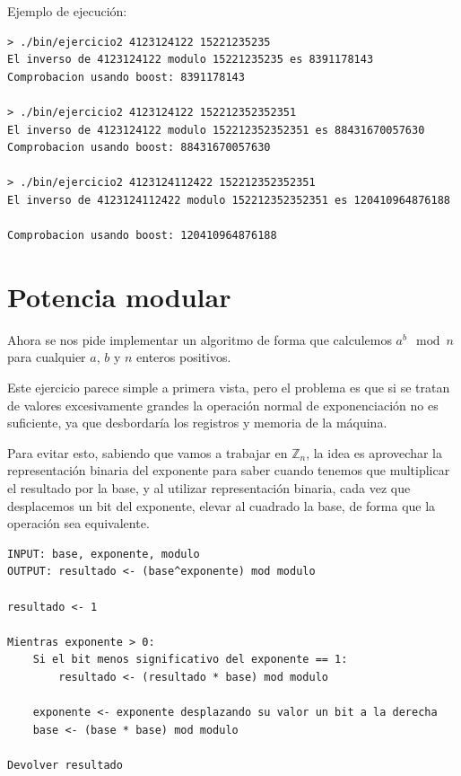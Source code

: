 \documentclass[12pt, spanish]{article}
\begin{document}
Ejemplo de ejecución:

\begin{lstlisting}
> ./bin/ejercicio2 4123124122 15221235235
El inverso de 4123124122 modulo 15221235235 es 8391178143
Comprobacion usando boost: 8391178143

> ./bin/ejercicio2 4123124122 152212352352351
El inverso de 4123124122 modulo 152212352352351 es 88431670057630
Comprobacion usando boost: 88431670057630

> ./bin/ejercicio2 4123124112422 152212352352351
El inverso de 4123124112422 modulo 152212352352351 es 120410964876188

Comprobacion usando boost: 120410964876188
\end{lstlisting}

\section{Potencia modular}

Ahora se nos pide implementar un algoritmo de forma que calculemos $a^b \mod n$ para cualquier $a$, $b$ y $n$ enteros positivos.

Este ejercicio parece simple a primera vista, pero el problema es que si se tratan de valores excesivamente grandes la operación normal de exponenciación no es suficiente, ya que desbordaría los registros y memoria de la máquina.

Para evitar esto, sabiendo que vamos a trabajar en $\mathbb{Z}_{n}$, la idea es aprovechar la representación binaria del exponente para saber cuando tenemos que multiplicar el resultado por la base, y al utilizar representación binaria, cada vez que desplacemos un bit del exponente, elevar al cuadrado la base, de forma que la operación sea equivalente.

\newpage

\begin{lstlisting}[caption={Algoritmo de exponenciación modular}]
INPUT: base, exponente, modulo
OUTPUT: resultado <- (base^exponente) mod modulo

resultado <- 1

Mientras exponente > 0:
	Si el bit menos significativo del exponente == 1:
		resultado <- (resultado * base) mod modulo

	exponente <- exponente desplazando su valor un bit a la derecha
	base <- (base * base) mod modulo

Devolver resultado
\end{lstlisting}
\end{document}
